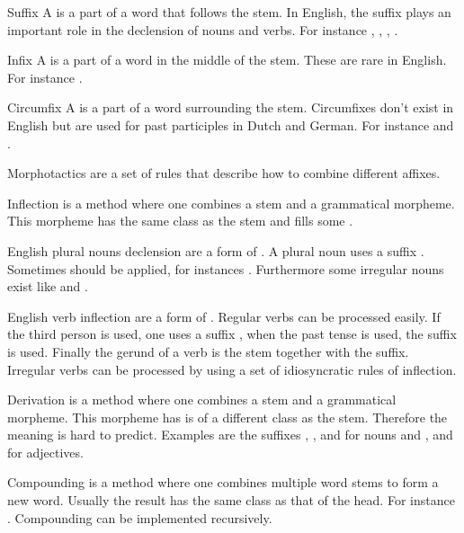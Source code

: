 \begin{df}{Suffix}
A \sb{} is a part of a word that follows the stem. In English, the suffix plays an important role in the declension of nouns and verbs. For instance , , , .
\end{df}
\begin{df}{Infix}
A \sb{} is a part of a word in the middle of the stem. These are rare in English. For instance .
\end{df}
\begin{df}{Circumfix}
A \sb{} is a part of a word surrounding the stem. Circumfixes don't exist in English but are used for past participles in Dutch and German. For instance  and .
\end{df}
\begin{df}{Morphotactics}
\sb{} are a set of rules that describe how to combine different affixes.
\end{df}
\begin{df}{Inflection}
\sb{} is a method where one combines a stem and a grammatical morpheme. This morpheme has the same \pos{} class as the stem and fills some .
\end{df}
\begin{df}{English plural nouns declension}
\sb{} are a form of . A plural noun uses a suffix . Sometimes  should be applied, for instances . Furthermore some irregular nouns exist like  and .
\end{df}
\begin{df}{English verb inflection}
\sb{} are a form of . Regular verbs can be processed easily. If the third person is used, one uses a suffix , when the past tense is used, the suffix  is used. Finally the gerund of a verb is the stem together with the  suffix. Irregular verbs can be processed by using a set of idiosyncratic rules of inflection.
\end{df}
\begin{df}{Derivation}
\sb{} is a method where one combines a stem and a grammatical morpheme. This morpheme has is of a different \pos{} class as the stem. Therefore the meaning is hard to predict. Examples are the suffixes , ,  and  for nouns and ,  and  for adjectives.
\end{df}
\begin{df}{Compounding}
\sb{} is a method where one combines multiple word stems to form a new word. Usually the result has the same class as that of the head. For instance . Compounding can be implemented recursively.
\end{df}

